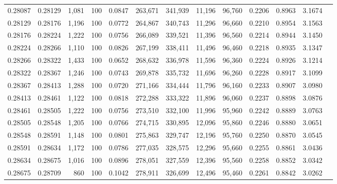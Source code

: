 \begin{tabular}{rrrrrrrrrrrrr}
0.28087 & 0.28129 &  1,081 & 100 &                                     0.0847 & 263,671 & 341,939 &  11,196 &  96,760 & 0.2206 & 0.8963 & 3.1674 \\
0.28129 & 0.28176 &  1,196 & 100 &                                     0.0772 & 264,867 & 340,743 &  11,296 &  96,660 & 0.2210 & 0.8954 & 3.1563 \\
0.28176 & 0.28224 &  1,222 & 100 &                                     0.0756 & 266,089 & 339,521 &  11,396 &  96,560 & 0.2214 & 0.8944 & 3.1450 \\
0.28224 & 0.28266 &  1,110 & 100 &                                     0.0826 & 267,199 & 338,411 &  11,496 &  96,460 & 0.2218 & 0.8935 & 3.1347 \\
0.28266 & 0.28322 &  1,433 & 100 &                                     0.0652 & 268,632 & 336,978 &  11,596 &  96,360 & 0.2224 & 0.8926 & 3.1214 \\
0.28322 & 0.28367 &  1,246 & 100 &                                     0.0743 & 269,878 & 335,732 &  11,696 &  96,260 & 0.2228 & 0.8917 & 3.1099 \\
0.28367 & 0.28413 &  1,288 & 100 &                                     0.0720 & 271,166 & 334,444 &  11,796 &  96,160 & 0.2233 & 0.8907 & 3.0980 \\
0.28413 & 0.28461 &  1,122 & 100 &                                     0.0818 & 272,288 & 333,322 &  11,896 &  96,060 & 0.2237 & 0.8898 & 3.0876 \\
0.28461 & 0.28505 &  1,222 & 100 &                                     0.0756 & 273,510 & 332,100 &  11,996 &  95,960 & 0.2242 & 0.8889 & 3.0763 \\
0.28505 & 0.28548 &  1,205 & 100 &                                     0.0766 & 274,715 & 330,895 &  12,096 &  95,860 & 0.2246 & 0.8880 & 3.0651 \\
0.28548 & 0.28591 &  1,148 & 100 &                                     0.0801 & 275,863 & 329,747 &  12,196 &  95,760 & 0.2250 & 0.8870 & 3.0545 \\
0.28591 & 0.28634 &  1,172 & 100 &                                     0.0786 & 277,035 & 328,575 &  12,296 &  95,660 & 0.2255 & 0.8861 & 3.0436 \\
0.28634 & 0.28675 &  1,016 & 100 &                                     0.0896 & 278,051 & 327,559 &  12,396 &  95,560 & 0.2258 & 0.8852 & 3.0342 \\
0.28675 & 0.28709 &    860 & 100 &                                     0.1042 & 278,911 & 326,699 &  12,496 &  95,460 & 0.2261 & 0.8842 & 3.0262 \\

\end{tabular}
